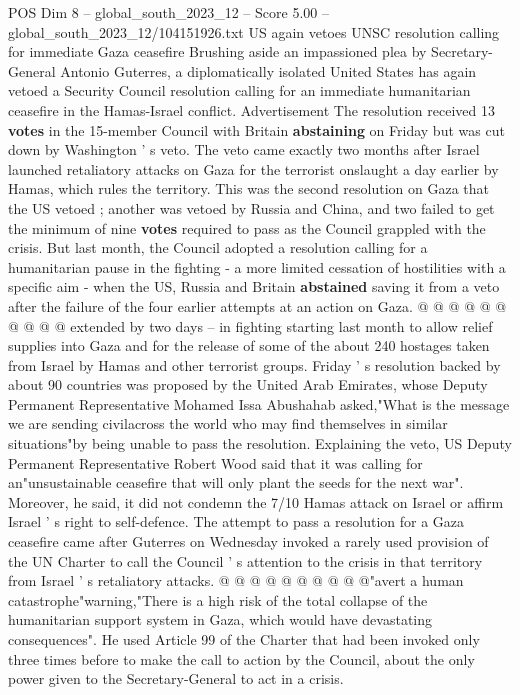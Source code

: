 \begin{textsample}{POS Dim 8 – global\_south\_2023\_12 – Score 5.00 – global\_south\_2023\_12/104151926.txt}  \label{ex:f8_pos_235}
US again vetoes UNSC resolution calling for immediate Gaza ceasefire Brushing aside an impassioned plea by Secretary-General Antonio Guterres, a diplomatically isolated United States has again vetoed a Security Council resolution calling for an immediate humanitarian ceasefire in the Hamas-Israel conflict.
Advertisement The resolution received 13 \textbf{votes} in the 15-member Council with Britain \textbf{abstaining} on Friday but was cut down by Washington ' s veto.
The veto came exactly two months after Israel launched retaliatory attacks on Gaza for the terrorist onslaught a day earlier by Hamas, which rules the territory.
This was the second resolution on Gaza that the US vetoed ; another was vetoed by Russia and China, and two failed to get the minimum of nine \textbf{votes} required to pass as the Council grappled with the crisis.
But last month, the Council adopted a resolution calling for a humanitarian pause in the fighting - a more limited cessation of hostilities with a specific aim - when the US, Russia and Britain \textbf{abstained} saving it from a veto after the failure of the four earlier attempts at an action on Gaza. @ @ @ @ @ @ @ @ @ @ extended by two days -- in fighting starting last month to allow relief supplies into Gaza and for the release of some of the about 240 hostages taken from Israel by Hamas and other terrorist groups.
Friday ' s resolution backed by about 90 countries was proposed by the United Arab Emirates, whose Deputy Permanent Representative Mohamed Issa Abushahab asked,"What is the message we are sending civilacross the world who may find themselves in similar situations"by being unable to pass the resolution.
Explaining the veto, US Deputy Permanent Representative Robert Wood said that it was calling for an"unsustainable ceasefire that will only plant the seeds for the next war".
Moreover, he said, it did not condemn the 7/10 Hamas attack on Israel or affirm Israel ' s right to self-defence.
The attempt to pass a resolution for a Gaza ceasefire came after Guterres on Wednesday invoked a rarely used provision of the UN Charter to call the Council ' s attention to the crisis in that territory from Israel ' s retaliatory attacks. @ @ @ @ @ @ @ @ @ @"avert a human catastrophe"warning,"There is a high risk of the total collapse of the humanitarian support system in Gaza, which would have devastating consequences".
He used Article 99 of the Charter that had been invoked only three times before to make the call to action by the Council, about the only power given to the Secretary-General to act in a crisis.

\end{textsample}
